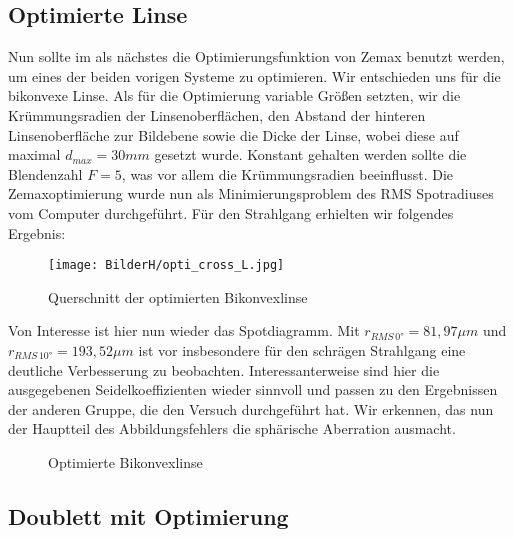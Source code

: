 \documentclass[twoside,colorback,accentcolor=tud4c,11pt]{tudreport}
\begin{document}
	\subsection{Optimierte Linse}
	
	Nun sollte im als nächstes die Optimierungsfunktion von Zemax benutzt werden, um eines der beiden vorigen Systeme zu optimieren. Wir entschieden uns für die bikonvexe Linse. Als für die Optimierung variable Größen setzten, wir die Krümmungsradien der Linsenoberflächen, den Abstand der hinteren Linsenoberfläche zur Bildebene sowie die Dicke der Linse, wobei diese auf maximal $d_{max} = 30 mm$ gesetzt wurde. Konstant gehalten werden sollte die Blendenzahl $F =5$, was vor allem die Krümmungsradien beeinflusst. Die Zemaxoptimierung wurde nun als Minimierungsproblem des RMS Spotradiuses vom Computer durchgeführt. Für den Strahlgang erhielten wir folgendes Ergebnis: 
	
	\begin{figure}[H]
\centering
   	\begin{minipage}[b]{\textwidth}
   	\centering
   	\texttt{[image: BilderH/opti\_cross\_L.jpg]}
   	\caption{Querschnitt der optimierten Bikonvexlinse}
  	\end{minipage}
\end{figure}
	
	Von Interesse ist hier nun wieder das Spotdiagramm. Mit $r_{RMS \, 0°} = 81,97 \mu m $ und $r_{RMS \, 10°} = 193,52 \mu m $ ist vor insbesondere für den schrägen Strahlgang eine deutliche Verbesserung zu beobachten. Interessanterweise sind hier die ausgegebenen Seidelkoeffizienten wieder sinnvoll und passen zu den Ergebnissen der anderen Gruppe, die den Versuch durchgeführt hat. Wir erkennen, das nun der Hauptteil des Abbildungsfehlers die sphärische Aberration ausmacht. 
	
	\begin{figure}[H]
\centering
  \quad
  \quad   
  \caption{Optimierte Bikonvexlinse}
\end{figure}
	
	\subsection{Doublett mit Optimierung}
	
\end{document}
